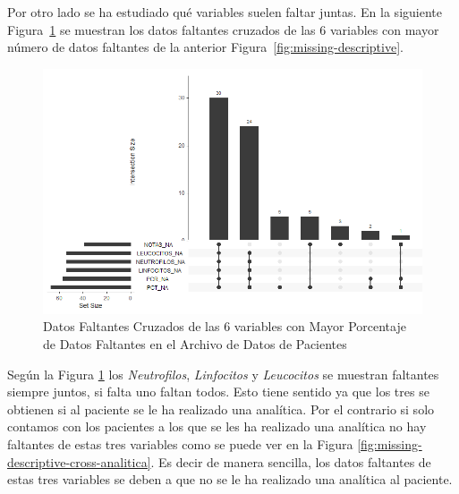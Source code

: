 Por otro lado se ha estudiado qué variables suelen faltar juntas. En la siguiente Figura~\ref{fig:missing-descriptive-cross} se muestran los datos faltantes cruzados de las 6 variables con mayor número de datos faltantes de la anterior Figura~\ref{fig:missing-descriptive}.

\begin{figure}[H]
    \centering
    \includegraphics[scale = 0.70]{./img/missig-data-descriptive-cross.png}
    \caption{Datos Faltantes Cruzados de las 6 variables con Mayor Porcentaje de Datos Faltantes en el Archivo de Datos de Pacientes}
    \label{fig:missing-descriptive-cross}
\end{figure}

Según la Figura \ref{fig:missing-descriptive-cross} los \textit{Neutrofilos}, \textit{Linfocitos} y \textit{Leucocitos} se muestran faltantes siempre juntos, si falta uno faltan todos. Esto tiene sentido ya que los tres se obtienen si al paciente se le ha realizado una analítica. Por el contrario si solo contamos con los pacientes a los que se les ha realizado una analítica no hay faltantes de estas tres variables como se puede ver en la Figura \ref{fig:missing-descriptive-cross-analitica}. Es decir de manera sencilla, los datos faltantes de estas tres variables se deben a que no se le ha realizado una analítica al paciente.

